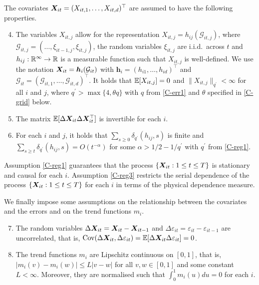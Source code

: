 \documentclass[12pt]{article}
\begin{document}
The covariates $\boldsymbol{X}_{it} = (X_{it,1},\ldots, X_{it, d})^\top$ are assumed to have the following properties. 
\begin{enumerate}[label=(C\arabic*),leftmargin=1.05cm, itemsep=0pt, parsep=0pt]
\setcounter{enumi}{3}
\item \label{C-reg1} The variables $X_{it, j}$ allow for the representation $X_{it, j} = h_{ij}(\mathcal{G}_{it, j})$, where $\mathcal{G}_{it, j} = (\ldots, \xi_{it-1,j}, \xi_{it, j})$, the random variables $\xi_{it, j}$ are i.i.d.\ across $t$ and $h_{ij}: \mathbb{R}^\infty \rightarrow \mathbb{R}$ is a measurable function such that $X_{it, j}$ is well-defined. We use the notation $\boldsymbol{X}_{it} = \boldsymbol{h}_{i}(\mathcal{G}_{it})$ with $\boldsymbol{h}_i = (h_{i1}, \ldots, h_{id})^\top$ and $\mathcal{G}_{it} = (\mathcal{G}_{it,1}, \ldots, \mathcal{G}_{it, d})^\top$. It holds that $\mathbb{E} [X_{it, j}]=0$ and $\| X_{it, j} \|_{q^\prime} <\infty$ for all $i$ and $j$, where $q^\prime > \max \{ 4, \theta q \}$ with $q$ from \ref{C-err1} and $\theta$ specified in \ref{C-grid} below.
\item \label{C-reg2} The matrix $\mathbb{E}[\Delta \boldsymbol{X}_{it} \Delta \boldsymbol{X}_{it}^\top]$ is invertible for each $i$.
\item \label{C-reg3} For each $i$ and $j$, it holds that $\sum_{s \ge 0} \delta_{q^\prime}(h_{ij}, s)$ is finite and $\sum_{s \ge t} \delta_{q^\prime}(h_{ij}, s)= O(t^{-\alpha})$ for some $\alpha > 1/2 - 1/{q^\prime}$ with $q^\prime$ from \ref{C-reg1}.
\end{enumerate}
Assumption \ref{C-reg1} guarantees that the process $\{ \boldsymbol{X}_{it}: 1 \le t \le T \}$ is stationary and causal for each $i$. Assumption \ref{C-reg3} restricts the serial dependence of the process $\{ \boldsymbol{X}_{it}: 1 \le t \le T \}$ for each $i$ in terms of the physical dependence measure.


We finally impose some assumptions on the relationship between the covariates and the errors and on the trend functions $m_i$.
\begin{enumerate}[label=(C\arabic*),leftmargin=1.05cm, itemsep=0pt, parsep=0pt]
\setcounter{enumi}{6}
\item \label{C-reg-err} The random variables $\Delta \boldsymbol{X}_{it} = \boldsymbol{X}_{it} - \boldsymbol{X}_{it-1}$ and $\Delta \varepsilon_{it} = \varepsilon_{it} - \varepsilon_{it-1}$ are uncorrelated, that is, $\textnormal{Cov}(\Delta \boldsymbol{X}_{it}, \Delta \varepsilon_{it}) = \mathbb{E}[\Delta \boldsymbol{X}_{it} \Delta \varepsilon_{it}] = 0$. 
\item \label{C-trend} The trend functions $m_i$ are Lipschitz continuous on $[0,1]$, that is, $|m_i(v) - m_i(w)| \le L |v-w|$ for all $v,w \in [0,1]$ and some constant $L < \infty$. Moreover, they are normalised such that $\int_0^1m_i (u)du = 0$ for each $i$.
\end{enumerate}
\end{document}
